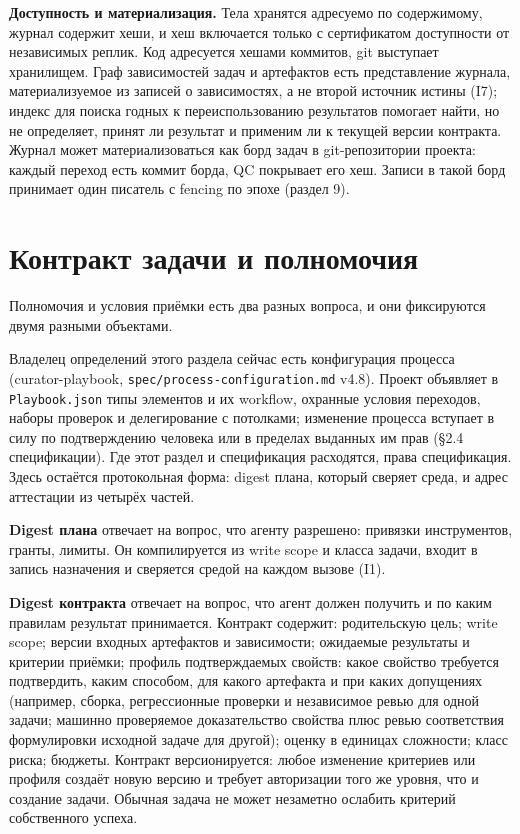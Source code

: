 \documentclass[11pt,a4paper]{article}
\begin{document}
\textbf{Доступность и материализация.} Тела хранятся адресуемо по содержимому, журнал содержит хеши, и хеш включается только с сертификатом доступности от независимых реплик. Код адресуется хешами коммитов, git выступает хранилищем. Граф зависимостей задач и артефактов есть представление журнала, материализуемое из записей о зависимостях, а не второй источник истины (I7); индекс для поиска годных к переиспользованию результатов помогает найти, но не определяет, принят ли результат и применим ли к текущей версии контракта. Журнал может материализоваться как борд задач в git-репозитории проекта: каждый переход есть коммит борда, QC покрывает его хеш. Записи в такой борд принимает один писатель с fencing по эпохе (раздел 9).

\section{Контракт задачи и полномочия}

Полномочия и условия приёмки есть два разных вопроса, и они фиксируются двумя разными объектами.

Владелец определений этого раздела сейчас есть конфигурация процесса (curator-playbook, \texttt{spec/process-configuration.md} v4.8). Проект объявляет в \texttt{Playbook.json} типы элементов и их workflow, охранные условия переходов, наборы проверок и делегирование с потолками; изменение процесса вступает в силу по подтверждению человека или в пределах выданных им прав (§2.4 спецификации). Где этот раздел и спецификация расходятся, права спецификация. Здесь остаётся протокольная форма: digest плана, который сверяет среда, и адрес аттестации из четырёх частей.

\textbf{Digest плана} отвечает на вопрос, что агенту разрешено: привязки инструментов, гранты, лимиты. Он компилируется из write scope и класса задачи, входит в запись назначения и сверяется средой на каждом вызове (I1).

\textbf{Digest контракта} отвечает на вопрос, что агент должен получить и по каким правилам результат принимается. Контракт содержит: родительскую цель; write scope; версии входных артефактов и зависимости; ожидаемые результаты и критерии приёмки; профиль подтверждаемых свойств: какое свойство требуется подтвердить, каким способом, для какого артефакта и при каких допущениях (например, сборка, регрессионные проверки и независимое ревью для одной задачи; машинно проверяемое доказательство свойства плюс ревью соответствия формулировки исходной задаче для другой); оценку в единицах сложности; класс риска; бюджеты. Контракт версионируется: любое изменение критериев или профиля создаёт новую версию и требует авторизации того же уровня, что и создание задачи. Обычная задача не может незаметно ослабить критерий собственного успеха.
\end{document}
